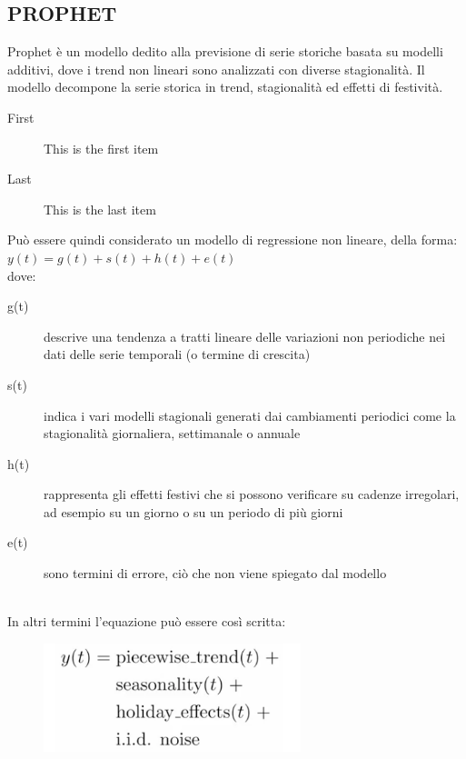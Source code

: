 \documentclass[12pt, a4paper, twocolumn]{article} %
\begin{document}
\subsection{PROPHET}
Prophet è un modello dedito alla previsione di serie storiche basata su modelli additivi, dove i trend non lineari sono analizzati con diverse stagionalità. Il modello decompone la serie storica in trend, stagionalità ed effetti di festività. 
\begin{description}
	\item[First] This is the first item
	\item[Last] This is the last item
\end{description}
Può essere quindi considerato un modello di regressione non lineare, della forma:
\\
$y(t) = g(t) + s(t) + h(t) + e(t)$
\\
dove:
\begin{description}
	\item[g(t)] descrive una tendenza a tratti lineare delle variazioni non periodiche nei dati delle serie temporali (o termine di crescita)
	\item[s(t)] indica i vari modelli stagionali generati dai cambiamenti periodici come la stagionalità giornaliera, settimanale o annuale
	\item[h(t)] rappresenta gli effetti festivi che si possono verificare su cadenze irregolari, ad esempio su un giorno o su un periodo di più giorni
	\item[e(t)] sono termini di errore, ciò che non viene spiegato dal modello
\end{description}
\cite{mathprophet}\cite{fbprophet}
\\
In altri termini l’equazione può essere così scritta:
\begin{figure}
  \caption{}
  \begin{center}
    \includegraphics[width=75mm,scale=0.5]{prophet.png}
  \end{center}
\end{figure}
\\
\end{document}
